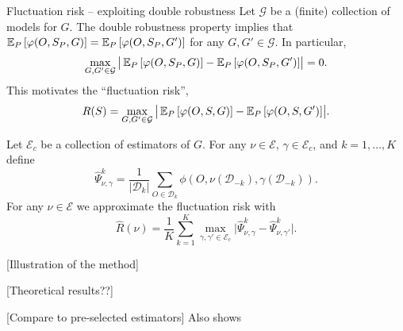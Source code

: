 \documentclass[smaller]{beamer}\usepackage{listings}
\begin{document}
\begin{frame}[label={sec:org40f36b8}]{Fluctuation risk -- exploiting double robustness}
\small Let \(\mathcal{G}\) be a (finite) collection of models for \(G\). The double robustness
property implies that
\(\operatorname{\mathbb{E}}_P{\left[ \varphi(O, S_P, G) \right]} = \operatorname{\mathbb{E}}_P{\left[ \varphi(O, S_P, G') \right]}\) for any
\(G, G' \in \mathcal{G}\). In particular,
\begin{equation*}
  \max_{G, G' \in \mathcal{G}}\big\vert
  \operatorname{\mathbb{E}}_P{\left[ \varphi(O, S_P, G) \right]}
  - \operatorname{\mathbb{E}}_P{\left[ \varphi(O, S_P, G') \right]}     
  \big\vert
  = 0.
\end{equation*}
This motivates the ``fluctuation risk'',
\begin{equation*}
  R(S)
  =
  \max_{G, G' \in \mathcal{G}}\big\vert
  \operatorname{\mathbb{E}}_P{\left[ \varphi(O, S, G) \right]}
  - \operatorname{\mathbb{E}}_P{\left[ \varphi(O, S, G') \right]}     
  \big\vert.
\end{equation*}

Let $\mathcal{E}_c$ be a collection of estimators of \(G\). For any $\nu \in \mathcal{E}$,
$\gamma \in \mathcal{E}_c$, and \(k = 1, \dots, K\) define
\begin{equation*}
  \hat{\Psi}_{\nu, \gamma}^k =
  \frac{1}{|\mathcal{D}_k|} \sum_{O \in \mathcal{D}_k}
  \phi(O, \nu(\mathcal{D}_{-k}), \gamma(\mathcal{D}_{-k})).
\end{equation*}
For any $\nu \in \mathcal{E}$ we approximate the fluctuation risk with
\begin{equation*}
  \hat R(\nu) =
  \frac{1}{K}
  \sum_{k=1}^{K}
  \max_{\gamma, \gamma' \in \mathcal{E}_c}
  \big|\hat{\Psi}_{\nu, \gamma}^k -
  \hat{\Psi}_{\nu, \gamma'}^k\big|.  
\end{equation*}
\end{frame}


\begin{frame}[label={sec:orgb13192c}]{[Illustration of the method]}
\end{frame}

\begin{frame}[label={sec:orged8a3da}]{[Theoretical results??]}
\end{frame}

\begin{frame}[label={sec:org1d360dc}]{[Compare to pre-selected estimators]}
Also shows 
\end{frame}
\end{document}
